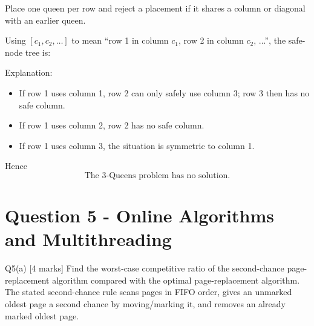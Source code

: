 \documentclass[10.5pt,a4paper]{article}
\begin{document}
\begin{answerbox}
Place one queen per row and reject a placement if it shares a column or diagonal with an earlier queen.

Using \([c_1,c_2,\ldots]\) to mean ``row 1 in column \(c_1\), row 2 in column \(c_2\), ...'', the safe-node tree is:

\begin{center}
\end{center}

Explanation:
\begin{itemize}[leftmargin=6mm]
\item If row 1 uses column 1, row 2 can only safely use column 3; row 3 then has no safe column.
\item If row 1 uses column 2, row 2 has no safe column.
\item If row 1 uses column 3, the situation is symmetric to column 1.
\end{itemize}
Hence
\[
\boxed{\text{The 3-Queens problem has no solution.}}
\]
\end{answerbox}

\section{Question 5 - Online Algorithms and Multithreading}

\begin{questionbox}{Q5(a) [4 marks]}
Find the worst-case competitive ratio of the second-chance page-replacement algorithm compared with the optimal page-replacement algorithm. The stated second-chance rule scans pages in FIFO order, gives an unmarked oldest page a second chance by moving/marking it, and removes an already marked oldest page.
\end{questionbox}
\end{document}
